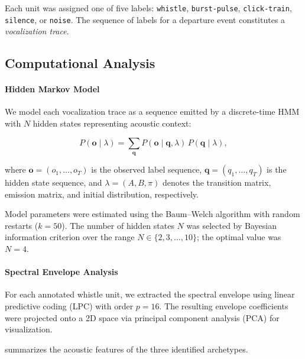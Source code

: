 Each unit was assigned one of five labels:
\texttt{whistle}, \texttt{burst-pulse}, \texttt{click-train},
\texttt{silence}, or \texttt{noise}.
The sequence of labels for a departure event constitutes a
\emph{vocalization trace}.

\subsection{Computational Analysis}
\label{subsec:analysis}

\paragraph{Hidden Markov Model}

We model each vocalization trace as a sequence emitted by a discrete-time
HMM with $N$ hidden states representing acoustic context:

\begin{equation}
	\label{eq:hmm-likelihood}
	P(\mathbf{o} \mid \lambda) =
	\sum_{\mathbf{q}} P(\mathbf{o} \mid \mathbf{q}, \lambda)\,
	P(\mathbf{q} \mid \lambda),
\end{equation}

where $\mathbf{o} = (o_1, \ldots, o_T)$ is the observed label sequence,
$\mathbf{q} = (q_1, \ldots, q_T)$ is the hidden state sequence, and
$\lambda = (A, B, \pi)$ denotes the transition matrix, emission matrix,
and initial distribution, respectively.

Model parameters were estimated using the Baum--Welch algorithm with random restarts ($k=50$).
The number of hidden states $N$ was selected by Bayesian information criterion over the range $N \in \{2, 3, \ldots, 10\}$;
the optimal value was $N = 4$.

\paragraph{Spectral Envelope Analysis}

For each annotated whistle unit, we extracted the spectral envelope using
linear predictive coding (LPC) with order $p = 16$.
The resulting envelope coefficients were projected onto a 2D space via
principal component analysis (PCA) for visualization.

 summarizes the acoustic features of
the three identified archetypes.


